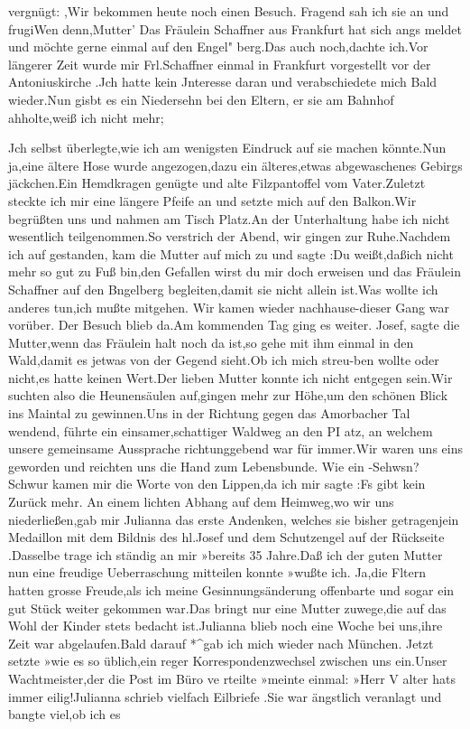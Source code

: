 \documentclass[a4paper,11pt]{article}
\begin{document}
   vergnügt: ,Wir bekommen heute noch einen Besuch. Fragend sah ich sie an und frugiWen denn,Mutter’ Das Fräulein Schaffner aus Frankfurt hat sich angs meldet und möchte gerne einmal auf den Engel" berg.Das auch noch,dachte ich.Vor längerer Zeit wurde mir Frl.Schaffner einmal in Frankfurt vorgestellt vor der Antoniuskirche .Jch hatte kein Jnteresse daran und verabschiedete mich Bald wieder.Nun gisbt es ein Niedersehn bei den Eltern, er sie am Bahnhof ahholte,weiß ich nicht mehr;

  Jch selbst überlegte,wie ich am wenigsten Eindruck auf sie machen könnte.Nun ja,eine ältere Hose wurde angezogen,dazu ein älteres,etwas abgewaschenes Gebirgs jäckchen.Ein Hemdkragen genügte und alte Filzpantoffel vom Vater.Zuletzt steckte ich mir eine längere Pfeife an und setzte mich auf den Balkon.Wir begrüßten uns und nahmen am Tisch Platz.An der Unterhaltung habe ich nicht wesentlich teilgenommen.So verstrich der Abend, wir gingen zur Ruhe.Nachdem ich auf gestanden, kam die Mutter auf mich zu und sagte :Du weißt,daßich nicht mehr so gut zu Fuß bin,den Gefallen wirst du mir doch erweisen und das Fräulein Schaffner auf den Bngelberg begleiten,damit sie nicht allein ist.Was wollte ich anderes tun,ich mußte mitgehen. Wir kamen wieder nachhause-dieser Gang war vorüber. Der Besuch blieb da.Am kommenden Tag ging es weiter. Josef, sagte die Mutter,wenn das Fräulein halt noch da ist,so gehe mit ihm einmal in den Wald,damit es jetwas von der Gegend sieht.Ob ich mich streu-ben wollte oder nicht,es hatte keinen Wert.Der lieben Mutter konnte ich nicht entgegen sein.Wir suchten also die Heunensäulen auf,gingen mehr zur Höhe,um den schönen Blick ins Maintal zu gewinnen.Uns in der Richtung gegen das Amorbacher Tal wendend, führte ein einsamer,schattiger Waldweg an den PI atz, an welchem unsere gemeinsame Aussprache richtunggebend war für immer.Wir waren uns eins geworden und reichten uns die Hand zum Lebensbunde. Wie ein -Sehwsn? Schwur kamen mir die Worte von den Lippen,da ich mir sagte :Fs gibt kein Zurück mehr. An einem lichten Abhang auf dem Heimweg,wo wir uns niederließen,gab mir Julianna das erste Andenken, welches sie bisher getragenjein Medaillon mit dem Bildnis des hl.Josef und dem Schutzengel auf der Rückseite .Dasselbe trage ich ständig an mir »bereits 35 Jahre.Daß ich der guten Mutter nun eine freudige Ueberraschung mitteilen konnte »wußte ich. Ja,die Fltern hatten grosse Freude,als ich meine Gesinnungsänderung offenbarte und sogar ein gut Stück weiter gekommen war.Das bringt nur eine Mutter zuwege,die auf das Wohl der Kinder stets bedacht ist.Julianna blieb noch eine Woche bei uns,ihre Zeit war abgelaufen.Bald darauf *^gab ich mich wieder nach München. Jetzt setzte »wie es so üblich,ein reger Korrespondenzwechsel zwischen uns ein.Unser Wachtmeister,der die Post im Büro ve rteilte »meinte einmal: »Herr V alter hats immer eilig!Julianna schrieb vielfach Eilbriefe .Sie war ängstlich veranlagt und bangte viel,ob ich es
\end{document}

